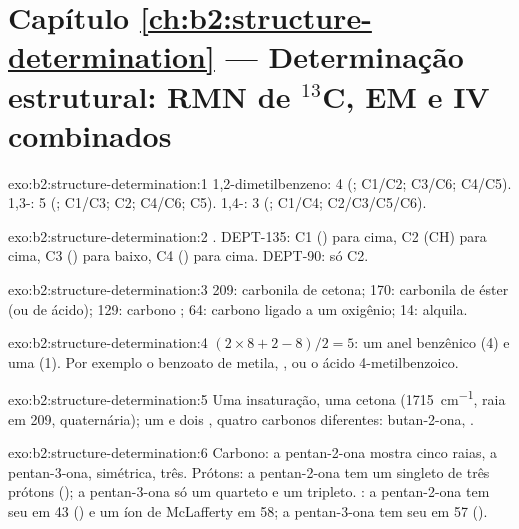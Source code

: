 \section*{Capítulo \ref{ch:b2:structure-determination} --- Determinação estrutural: RMN de \texorpdfstring{$^{13}$C}{13C}, EM e IV combinados}

\begin{solution}{exo:b2:structure-determination:1}
1,2-dimetilbenzeno: 4 (; C1/C2; C3/C6; C4/C5). 1,3-: 5 (; C1/C3; C2; C4/C6; C5).
1,4-: 3 (; C1/C4; C2/C3/C5/C6).
\end{solution}

\begin{solution}{exo:b2:structure-determination:2}
. DEPT-135: C1 () para cima, C2 (CH) para cima, C3 () para baixo,
C4 () para cima. DEPT-90: só C2.
\end{solution}

\begin{solution}{exo:b2:structure-determination:3}
209: carbonila de cetona; 170: carbonila de éster (ou de ácido); 129: carbono ; 64: carbono
ligado a um oxigênio; 14:  alquila.
\end{solution}

\begin{solution}{exo:b2:structure-determination:4}
$(2 \times 8 + 2 - 8)/2 = 5$: um anel benzênico (4) e uma  (1). Por exemplo o benzoato de metila,
, ou o ácido 4-metilbenzoico.
\end{solution}

\begin{solution}{exo:b2:structure-determination:5}
Uma insaturação, uma cetona (\qty{1715}{cm^{-1}}, raia em 209, quaternária); um  e dois
, quatro carbonos diferentes: butan-2-ona, .
\end{solution}

\begin{solution}{exo:b2:structure-determination:6}
Carbono: a pentan-2-ona mostra cinco raias, a pentan-3-ona, simétrica, três. Prótons: a pentan-2-ona tem
um singleto de três prótons (); a pentan-3-ona só um quarteto e um tripleto. :
a pentan-2-ona tem seu  em 43 () e um íon de McLafferty em 58; a pentan-3-ona tem seu
 em 57 ().
\end{solution}


